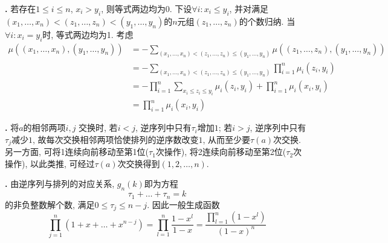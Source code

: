\par \textbf{\thesolenum .} \cite{IC} 若存在$1\le i\le n$, $x_i>y_i$, 则等式两边均为0. 下设$\forall i: x_i\le y_i$, 并对满足$(x_1,\dots,x_n)< (z_1,\dots,z_n)<(y_1,\dots,y_n)$的$n$元组$(z_1,\dots,z_n)$的个数归纳. 当$\forall i: x_i=y_i$时, 等式两边均为1. 考虑\begin{align*}
    \mu((x_1,\dots,x_n), (y_1,\dots,y_n)) &= -\sum_{(x_1,\dots,x_n)<(z_1,\dots,z_n)\le (y_1,\dots,y_n)} \mu((z_1,\dots,z_n), (y_1,\dots,y_n))\\
    &=-\sum_{(x_1,\dots,x_n)<(z_1,\dots,z_n)\le (y_1,\dots,y_n)} \prod_{i=1}^n \mu_i(z_i,y_i)\\
    &=-\prod_{i=1}^n \sum_{x_i\le z_i\le y_i} \mu_i(z_i,y_i) + \prod_{i=1}^n \mu_i(x_i,y_i)\\
    &= \prod_{i=1}^n \mu_i(x_i,y_i)
\end{align*}


\par \textbf{\thesolenum .} 将$a$的相邻两项$i, j$ 交换时, 若$i<j$, 逆序列中只有$\tau_i$增加$1$; 若$i>j$, 逆序列中只有$\tau_j$减少$1$, 故每次交换相邻两项恰使排列的逆序数改变$1$, 从而至少要$\tau(a)$次交换. 另一方面, 可将1连续向前移动至第1位($\tau_1$次操作), 将2连续向前移动至第2位($\tau_2$次操作), 以此类推, 可经过$\tau(a)$次交换得到$(1,2,\dots,n)$. 

\par \textbf{\thesolenum .} \cite{IC} 由逆序列与排列的对应关系, $g_n(k)$即为方程
\begin{equation*}
    \tau_1 + \dots + \tau_n = k
\end{equation*}
的非负整数解个数, 满足$0\le \tau_j\le n-j$. 因此一般生成函数
\begin{equation*}
    \prod_{j=1}^n (1+x+\dots+x^{n-j}) = \prod_{l=1}^n \frac{1-x^l}{1-x}=\frac{\prod_{l=1}^n (1-x^l)}{(1-x)^n}
\end{equation*}

